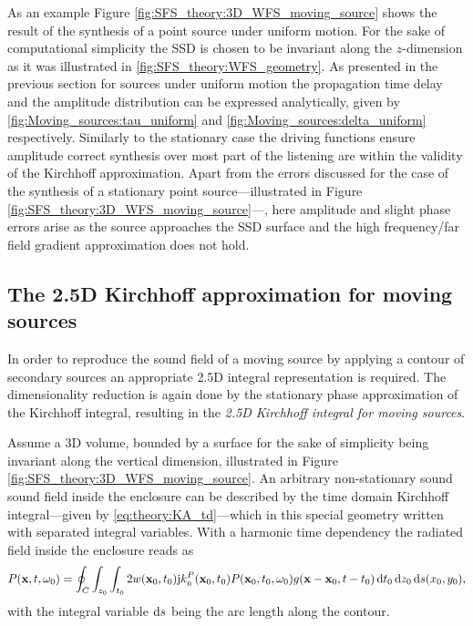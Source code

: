 As an example Figure \ref{fig:SFS_theory:3D_WFS_moving_source} shows the result of the synthesis of a point source under uniform motion.
For the sake of computational simplicity the SSD is chosen to be invariant along the $z$-dimension as it was illustrated in \ref{fig:SFS_theory:WFS_geometry}.
As presented in the previous section for sources under uniform motion the propagation time delay and the amplitude distribution can be expressed analytically, given by \eqref{fig:Moving_sources:tau_uniform} and \eqref{fig:Moving_sources:delta_uniform} respectively.
Similarly to the stationary case the driving functions ensure amplitude correct synthesis over most part of the listening are within the validity of the Kirchhoff approximation.
Apart from the errors discussed for the case of the synthesis of a stationary point source---illustrated in Figure \ref{fig:SFS_theory:3D_WFS_moving_source}---, here amplitude and slight phase errors arise as the source approaches the SSD surface and the high frequency/far field gradient approximation does not hold.

\subsection{The 2.5D Kirchhoff approximation for moving sources}

In order to reproduce the sound field of a moving source by applying a contour of secondary sources an appropriate 2.5D integral representation is required.
The dimensionality reduction is again done by the stationary phase approximation of the Kirchhoff integral, resulting in the \emph{2.5D Kirchhoff integral for moving sources}.

Assume a 3D volume, bounded by a surface for the sake of simplicity being invariant along the vertical dimension, illustrated in Figure \ref{fig:SFS_theory:3D_WFS_moving_source}.
An arbitrary non-stationary sound sound field inside the enclosure can be described by the time domain Kirchhoff integral---given by \eqref{eq:theory:KA_td}---which in this special geometry written with separated integral variables.
With a harmonic time dependency the radiated field inside the enclosure reads as
\begin{equation}
\small
P(\mathbf{x},t,\omega_0) = 
\oint_{C} \int_{z_0} \int_{t_0}
2 w(\mathbf{x}_0,t_0) \mathrm{j} k_{\mathrm{n}}^P(\mathbf{x}_0,t_0) 	
P(\mathbf{x}_0,t_0,\omega_0) g(\mathbf{x}-\mathbf{x}_0,t-t_0) \, \mathrm{d} t_0 \, \mathrm{d} z_0 \, \mathrm{d} s(x_0, y_0),
\label{Eq:SFS_theory:Kirchhoff_spec_geom_td}
\end{equation}
with the integral variable $\mathrm{d} s$ being the arc length along the contour.
%

